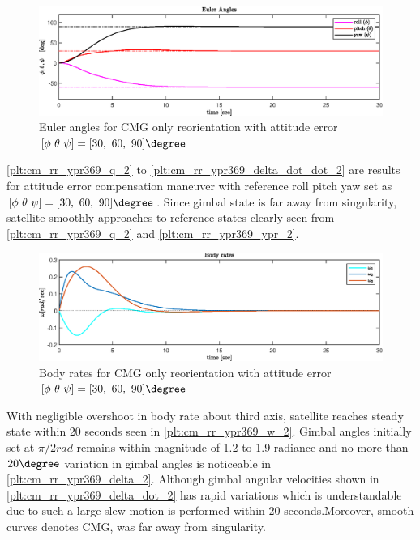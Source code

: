 \begin{figure}[H]
     \centering
    \includegraphics[width=0.9\columnwidth]{figures/plots/CMG/cm_rr_ypr369_ypr.eps}
    \caption{Euler angles for CMG only reorientation with attitude error $\displaystyle [\phi\ \theta\ \psi] =[30,\ 60,\ 90]\degree $}
    \label{plt:cm_rr_ypr369_ypr_2}
\end{figure}
\autoref{plt:cm_rr_ypr369_q_2} to \autoref{plt:cm_rr_ypr369_delta_dot_dot_2} are results for attitude error compensation maneuver with reference roll pitch yaw set as $\displaystyle [\phi\ \theta\ \psi] =[30,\ 60,\ 90]\degree $. Since gimbal state is far away from singularity, satellite smoothly approaches to reference states clearly seen from \autoref{plt:cm_rr_ypr369_q_2} and \autoref{plt:cm_rr_ypr369_ypr_2}.
\begin{figure}[H]
     \centering
    \includegraphics[width=0.9\columnwidth]{figures/plots/CMG/cm_rr_ypr369_w.eps}
    \caption{Body rates for CMG only reorientation with attitude error $\displaystyle [\phi\ \theta\ \psi] =[30,\ 60,\ 90]\degree $}
    \label{plt:cm_rr_ypr369_w_2}
\end{figure}
With negligible overshoot in body rate about third axis, satellite reaches steady state within 20 seconds seen in \autoref{plt:cm_rr_ypr369_w_2}. Gimbal angles initially set at $\pi/2 rad$ remains within magnitude of 1.2 to 1.9 radiance and no more than $20 \degree$ variation in gimbal angles is noticeable in \autoref{plt:cm_rr_ypr369_delta_2}. Although gimbal angular velocities shown in \autoref{plt:cm_rr_ypr369_delta_dot_2} has rapid variations which is understandable due to such a large slew motion is performed within 20 seconds.Moreover, smooth curves denotes CMG, was far away from singularity. 

